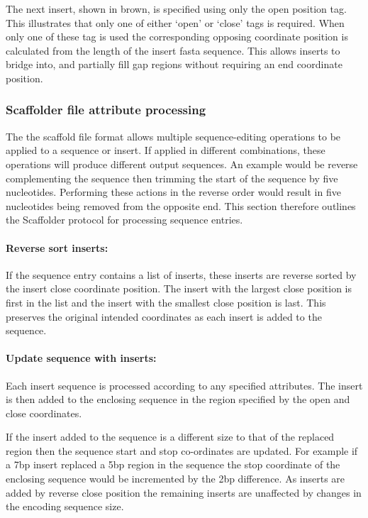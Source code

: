\documentclass[10pt]{bmc_article}
\newenvironment{bmcformat}{\begin{raggedright}\baselineskip20pt\sloppy\setboolean{publ}{false}}{\end{raggedright}\baselineskip20pt\sloppy}
\begin{document}
\begin{bmcformat}
The next insert, shown in brown, is specified using only the open position tag.
This illustrates that only one of either `open' or `close' tags is required.
When only one of these tag is used the corresponding opposing coordinate
position is calculated from the length of the insert fasta sequence. This
allows inserts to bridge into, and partially fill gap regions without requiring
an end coordinate position. \pb

\subsubsection*{Scaffolder file attribute processing} %

The the scaffold file format allows multiple sequence-editing operations to be
applied to a sequence or insert. If applied in different combinations, these
operations will produce different output sequences. An example would be reverse
complementing the sequence then trimming the start of the sequence by five
nucleotides. Performing these actions in the reverse order would result in five
nucleotides being removed from the opposite end. This section therefore
outlines the Scaffolder protocol for processing sequence entries. \pb

\paragraph{Reverse sort inserts:} If the sequence entry contains a list of
inserts, these inserts are reverse sorted by the insert close coordinate
position. The insert with the largest close position is first in the list and
the insert with the smallest close position is last. This preserves the
original intended coordinates as each insert is added to the sequence. \pb

\paragraph{Update sequence with inserts:} Each insert sequence is processed
according to any specified attributes. The insert is then added to the
enclosing sequence in the region specified by the open and close coordinates.
\pb

If the insert added to the sequence is a different size to that of the
replaced region then the sequence start and stop co-ordinates are updated. For
example if a 7bp insert replaced a 5bp region in the sequence the stop
coordinate of the enclosing sequence would be incremented by the 2bp
difference. As inserts are added by reverse close position the remaining
inserts are unaffected by changes in the encoding sequence size. \pb


\end{bmcformat}
\end{document}
